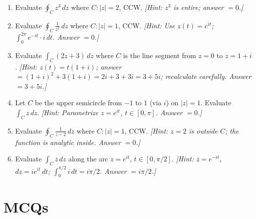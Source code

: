 \documentclass[12pt,a4paper]{article}
\begin{document}
\begin{enumerate}[leftmargin=2em]

\item Evaluate $\displaystyle\oint_C z^3\,dz$ where $C:|z|=2$, CCW.
\quad\textit{[Hint: $z^3$ is entire; answer $= 0$.]}

\item Evaluate $\displaystyle\oint_C \frac{1}{z^2}\,dz$ where $C:|z|=1$, CCW.
\quad\textit{[Hint: Use $z(t)=e^{it}$; $\int_0^{2\pi}e^{-it}\cdot i\,dt$.
Answer $= 0$.]}

\item Evaluate $\displaystyle\int_C (2z + 3)\,dz$ where $C$ is the line segment from
$z=0$ to $z=1+i$.
\quad\textit{[Hint: $z(t)=t(1+i)$; answer $= (1+i)^2+3(1+i) = 2i + 3 + 3i = 3+5i$;
recalculate carefully. Answer $= 3+5i$.]}

\item Let $C$ be the upper semicircle from $-1$ to $1$ (via $i$) on $|z|=1$.
Evaluate $\displaystyle\int_C z\,dz$.
\quad\textit{[Hint: Parametrize $z=e^{it}$, $t\in[0,\pi]$. Answer $= 0$.]}

\item Evaluate $\displaystyle\oint_C \frac{1}{z-2}\,dz$ where $C:|z|=1$, CCW.
\quad\textit{[Hint: $z=2$ is outside $C$; the function is analytic inside.
Answer $= 0$.]}

\item Evaluate $\displaystyle\int_C \overline{z}\,dz$ along the arc $z=e^{it}$,
$t\in[0,\pi/2]$.
\quad\textit{[Hint: $\overline{z}=e^{-it}$, $dz=ie^{it}\,dt$;
$\int_0^{\pi/2}i\,dt = i\pi/2$. Answer $= i\pi/2$.]}

\end{enumerate}

\section{MCQs}
\end{document}
